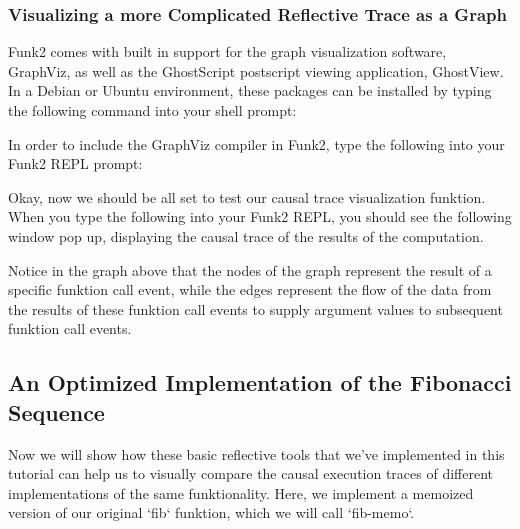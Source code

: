 \subsubsection{Visualizing a more Complicated Reflective Trace as a Graph}

Funk2 comes with built in support for the graph visualization
software, GraphViz, as well as the GhostScript postscript viewing
application, GhostView.  In a Debian or Ubuntu environment, these
packages can be installed by typing the following command into your
shell prompt:


In order to include the GraphViz compiler in Funk2, type the following
into your Funk2 REPL prompt:


Okay, now we should be all set to test our causal trace visualization
funktion.  When you type the following into your Funk2 REPL, you
should see the following window pop up, displaying the causal trace of
the results of the computation.

%
%
%
%
%
%
%


Notice in the graph above that the nodes of the graph represent the
result of a specific funktion call event, while the edges represent
the flow of the data from the results of these funktion call events to
supply argument values to subsequent funktion call events.

\subsection{An Optimized Implementation of the Fibonacci Sequence}

Now we will show how these basic reflective tools that we've
implemented in this tutorial can help us to visually compare the
causal execution traces of different implementations of the same
funktionality.  Here, we implement a memoized version of our original
`fib` funktion, which we will call `fib-memo`.

%
%
%

